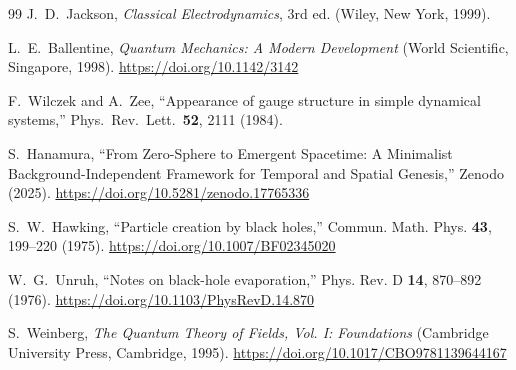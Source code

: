 \documentclass[%
 reprint,
 amsmath,amssymb,
 aps,
 prb,
]{revtex4-2}
\numberwithin{equation}{section}
\begin{document}
\begin{thebibliography}{99}
J.~D.~Jackson,
\textit{Classical Electrodynamics}, 3rd ed.
(Wiley, New York, 1999).

L.~E.~Ballentine,
\textit{Quantum Mechanics: A Modern Development}
(World Scientific, Singapore, 1998).
\href{https://doi.org/10.1142/3142}{https://doi.org/10.1142/3142}

F.~Wilczek and A.~Zee,
``Appearance of gauge structure in simple dynamical systems,''
Phys.\ Rev.\ Lett.\ {\bf 52}, 2111 (1984).

S.~Hanamura,
``From Zero-Sphere to Emergent Spacetime: A Minimalist Background-Independent Framework for Temporal and Spatial Genesis,''
Zenodo (2025).
\href{https://doi.org/10.5281/zenodo.17765336}{https://doi.org/10.5281/zenodo.17765336}

S.~W.~Hawking,
``Particle creation by black holes,''
Commun. Math. Phys. \textbf{43}, 199--220 (1975).
\href{https://doi.org/10.1007/BF02345020}{https://doi.org/10.1007/BF02345020}

W.~G.~Unruh,
``Notes on black-hole evaporation,''
Phys. Rev. D \textbf{14}, 870--892 (1976).
\href{https://doi.org/10.1103/PhysRevD.14.870}{https://doi.org/10.1103/PhysRevD.14.870}

S.~Weinberg,
\textit{The Quantum Theory of Fields, Vol. I: Foundations}
(Cambridge University Press, Cambridge, 1995).
\href{https://doi.org/10.1017/CBO9781139644167}{https://doi.org/10.1017/CBO9781139644167}

\end{thebibliography}
\end{document}
